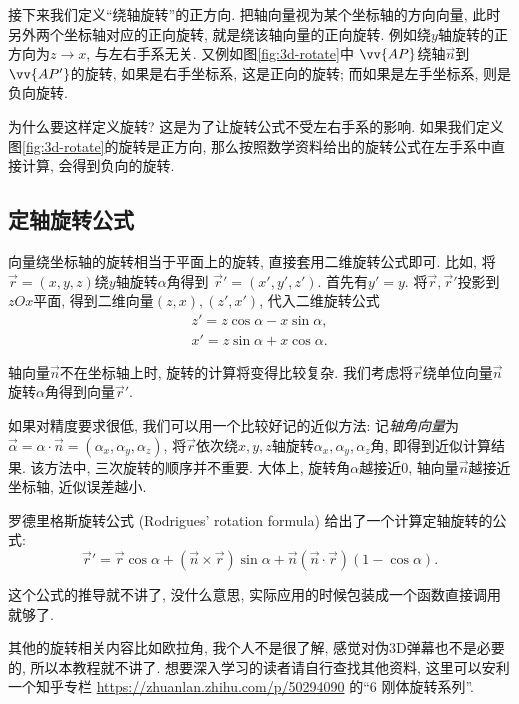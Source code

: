 接下来我们定义``绕轴旋转''的正方向.
把轴向量视为某个坐标轴的方向向量,
此时另外两个坐标轴对应的正向旋转,
就是绕该轴向量的正向旋转.
例如绕$y$轴旋转的正方向为$z\to x$,
与左右手系无关.
又例如图\ref{fig:3d-rotate}中
$\vv{AP}$绕轴$\vec n$到$\vv{AP'}$的旋转,
如果是右手坐标系, 这是正向的旋转;
而如果是左手坐标系, 则是负向旋转.

为什么要这样定义旋转?
这是为了让旋转公式不受左右手系的影响.
如果我们定义图\ref{fig:3d-rotate}的旋转是正方向,
那么按照数学资料给出的旋转公式在左手系中直接计算,
会得到负向的旋转.

\subsection{定轴旋转公式}

向量绕坐标轴的旋转相当于平面上的旋转,
直接套用二维旋转公式即可.
比如, 将$\vec r=(x,y,z)$绕$y$轴旋转$\alpha$角得到
$\vec r'=(x',y',z')$.
首先有$y'=y$. 将$\vec r,\vec r'$投影到$zOx$平面,
得到二维向量$(z,x),(z',x')$, 代入二维旋转公式
\begin{align*}
  z' = z\cos\alpha - x\sin\alpha, \\
  x' = z\sin\alpha + x\cos\alpha.
\end{align*}

轴向量$\vec n$不在坐标轴上时, 旋转的计算将变得比较复杂.
我们考虑将$\vec r$绕单位向量$\vec n$旋转$\alpha$角得到向量$\vec r'$.

如果对精度要求很低, 我们可以用一个比较好记的近似方法:
记\emph{轴角向量}为$\vec\alpha = \alpha\cdot\vec n
  = (\alpha_x,\alpha_y,\alpha_z)$,
将$\vec r$依次绕$x,y,z$轴旋转$\alpha_x,\alpha_y,\alpha_z$角,
即得到近似计算结果. 该方法中, 三次旋转的顺序并不重要.
大体上, 旋转角$\alpha$越接近0, 轴向量$\vec n$越接近坐标轴, 近似误差越小.

罗德里格斯旋转公式 (Rodrigues' rotation formula)
给出了一个计算定轴旋转的公式:
\[
\vec r' = \vec r \cos\alpha
+ (\vec n \times \vec r) \sin\alpha
+ \vec n (\vec n\cdot\vec r)(1 - \cos\alpha).
\]

这个公式的推导就不讲了, 没什么意思, 实际应用的时候包装成一个函数直接调用就够了.

其他的旋转相关内容比如欧拉角,
我个人不是很了解, 感觉对伪3D弹幕也不是必要的,
所以本教程就不讲了. 想要深入学习的读者请自行查找其他资料,
这里可以安利一个知乎专栏
\url{https://zhuanlan.zhihu.com/p/50294090}
的``6 刚体旋转系列''.
